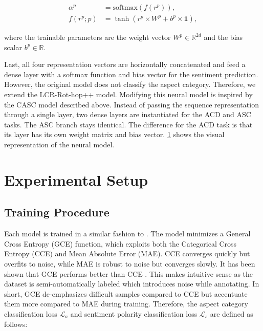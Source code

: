\documentclass[american, oneside]{ecsgdp}
\begin{document}
\begin{align}
    \alpha^p                         & = \text{softmax}\left( f \left( r^p\right) \right), \label{eq:hier_alpha}\\
    f \left( r^p; p \right) & = \tanh{\left( r^{p} \times W^p + b^p \times \mathbf{1} \right)}, \label{eq:hier_tanh}
\end{align}

\noindent where the trainable parameters are the weight vector $W^p \in \mathbb{R}^{2d}$ and the bias scalar $b^p \in \mathbb{R}$. 

Last, all four representation vectors are horizontally concatenated and feed a dense layer with a softmax function and bias vector for the sentiment prediction. However, the original model does not classify the aspect category. Therefore, we extend the LCR-Rot-hop++ model. Modifying this neural model is inspired by the CASC model described above. Instead of passing the sequence representation through a single layer, two dense layers are instantiated for the ACD and ASC tasks. The ASC branch stays identical. The difference for the ACD task is that its layer has its own weight matrix and bias vector. \cref{fig:CASC+LCR} shows the visual representation of the neural model.

\begin{figure}[htbp]
  \centering
  
  \caption{}
  \label{fig:CASC+LCR}
\end{figure}

\section{Experimental Setup} \label{sec:setup}
\subsection{Training Procedure} \label{sec:training}
Each model is trained in a similar fashion to \textcite{Kumar2021CASC}. The model minimizes a General Cross Entropy (GCE) function, which exploits both the Categorical Cross Entropy (CCE) and Mean Absolute Error (MAE). %
CCE converges quickly but overfits to noise, while MAE is robust to noise but converges slowly. It has been shown that GCE performs better than CCE \parencite{Kumar2021CASC}. This makes intuitive sense as the dataset is semi-automatically labeled which introduces noise while annotating. In short, GCE de-emphasizes difficult samples compared to CCE but accentuate them more compared to MAE during training. Therefore, the aspect category classification loss $\mathcal{L}_a$ and sentiment polarity classification loss $\mathcal{L}_s$ are defined as follows:
\end{document}
